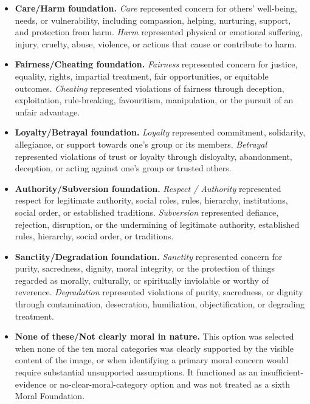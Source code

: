 \begin{itemize}

\item \textbf{Care/Harm foundation.}
\textit{Care} represented concern for others' well-being, needs, or
vulnerability, including compassion, helping, nurturing, support, and
protection from harm. \textit{Harm} represented physical or emotional
suffering, injury, cruelty, abuse, violence, or actions that cause or
contribute to harm.

\item \textbf{Fairness/Cheating foundation.}
\textit{Fairness} represented concern for justice, equality, rights,
impartial treatment, fair opportunities, or equitable outcomes.
\textit{Cheating} represented violations of fairness through deception,
exploitation, rule-breaking, favouritism, manipulation, or the pursuit of
an unfair advantage.

\item \textbf{Loyalty/Betrayal foundation.}
\textit{Loyalty} represented commitment, solidarity, allegiance, or
support towards one's group or its members. \textit{Betrayal} represented
violations of trust or loyalty through disloyalty, abandonment,
deception, or acting against one's group or trusted others.

\item \textbf{Authority/Subversion foundation.}
\textit{Respect / Authority} represented respect for legitimate
authority, social roles, rules, hierarchy, institutions, social order, or
established traditions. \textit{Subversion} represented defiance,
rejection, disruption, or the undermining of legitimate authority,
established rules, hierarchy, social order, or traditions.

\item \textbf{Sanctity/Degradation foundation.}
\textit{Sanctity} represented concern for purity, sacredness, dignity,
moral integrity, or the protection of things regarded as morally,
culturally, or spiritually inviolable or worthy of reverence.
\textit{Degradation} represented violations of purity, sacredness, or
dignity through contamination, desecration, humiliation, objectification,
or degrading treatment.

\item \textbf{None of these/Not clearly moral in nature.}
This option was selected when none of the ten moral categories was clearly
supported by the visible content of the image, or when identifying a primary
moral concern would require substantial unsupported assumptions. It functioned
as an insufficient-evidence or no-clear-moral-category option and was not
treated as a sixth Moral Foundation.

\end{itemize}

